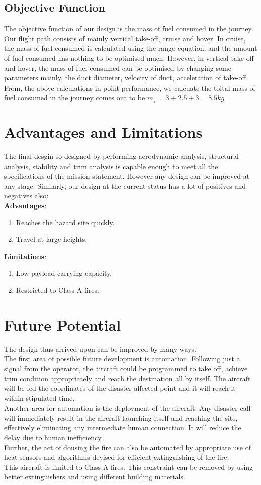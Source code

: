 \section{Objective Function}
The objective function of our design is the mass of fuel consumed in the journey. Our flight path consists of mainly vertical take-off, cruise and hover. 
In cruise, the mass of fuel consumed is calculated using the range equation, and the amount of fuel consumed has nothing to be optimised much. However, in vertical take-off and hover, the mass of fuel
consumed can be optimised by changing some parameters mainly, the duct diameter, velocity of duct, acceleration of take-off.
From, the above calculations in point performance, we calcuate the toital mass of fuel consumed in the journey comes out to be
$m_f = 3 + 2.5 +3 = 8.5kg $ 
\chapter{Advantages and Limitations}
The final desgin so designed by performing aerodynamic analysis, structural analysis, stability and trim analysis is capable enough to meet all the specifications 
of the mission statement. However any design can be improved at any stage. Similarly, our design at the current status has a lot of positives and negatives also: \\
\textbf{Advantages}:
\begin{enumerate}
 \item Reaches the hazard site quickly.
 \item Travel at large heights.
\end{enumerate}
\textbf{Limitations}:
\begin{enumerate}
 \item Low payload carrying capacity.
 \item Restricted to Class A fires.
\end{enumerate}

\chapter{Future Potential}
The design thus arrived upon can be improved by many ways.  \\
The first area of possible future development is automation. Following just a signal from the operator, the aircraft could be programmed to take off, achieve trim condition appropriately and reach the destination all by itself. The aircraft will be fed the coordinates of the disaster affected point and it will reach it within stipulated time.\\
Another area for automation is the deployment of the aircraft. Any disaster call will immediately result in the aircraft launching itself and reaching the site, effectively eliminating any intermediate human connection. It will reduce the delay due to human inefficiency.\\
Further, the act of dousing the fire can also be automated by appropriate use of heat sensors and algorithms devised for efficient extinguishing of the fire.\\
This aircraft is limited to Class A fires. This constraint can be removed by using better extinguishers and using different building materials.\\
